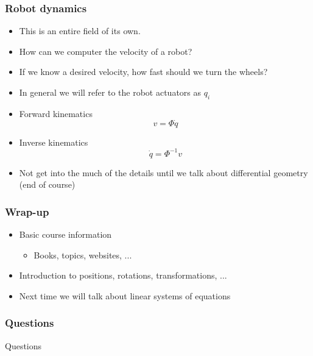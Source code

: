 \documentclass[10pt]{beamer}
\begin{document}
\begin{frame}
  \frametitle{Robot dynamics}
  \begin{itemize}
  \item This is an entire field of its own. 
  \item How can we computer the velocity of a robot? 
  \item If we know a desired velocity, how fast should we turn the wheels? 
  \item In general we will refer to the robot actuators as $q_i$
  \item Forward kinematics
    \[
      v = \Phi \dot{q}
    \]
  \item Inverse kinematics
    \[
      \dot{q} = \Phi^{-1} v
    \]
  \item Not get into the much of the details until we talk about differential geometry (end of course)
  \end{itemize}
\end{frame}

\begin{frame}
  \frametitle{Wrap-up}
  \begin{itemize}
  \item Basic course information
    \begin{itemize}
    \item Books, topics, websites, ...
    \end{itemize}
  \item Introduction to positions, rotations, transformations, ... 
  \item Next time we will talk about linear systems of equations
  \end{itemize}
\end{frame}

\begin{frame}
  \frametitle{Questions}
  \centerline{\Huge Questions}
\end{frame}
\end{document}
